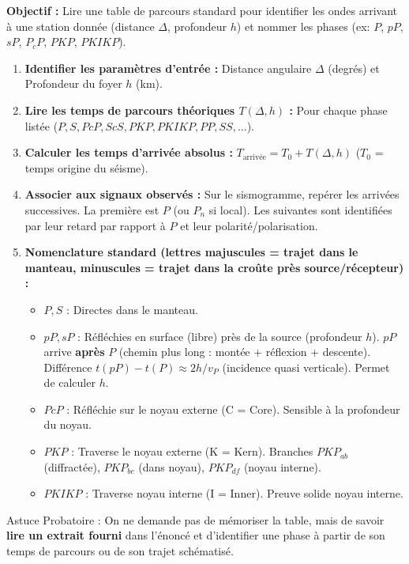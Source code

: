 \documentclass[11pt]{article}
\newcommand{\cle}[1]{{\popxbold\color{popdark}#1}}
\begin{document}
\begin{methode}
\textbf{Objectif :} Lire une table de parcours standard pour identifier les ondes arrivant à une station donnée (distance $\Delta$, profondeur $h$) et nommer les phases (ex: $P$, $pP$, $sP$, $P_cP$, $PKP$, $PKIKP$).
\begin{enumerate}
    \item \textbf{Identifier les paramètres d'entrée :} Distance angulaire $\Delta$ (degrés) et Profondeur du foyer $h$ (km).
    \item \textbf{Lire les temps de parcours théoriques $T(\Delta, h)$ :} Pour chaque phase listée ($P, S, PcP, ScS, PKP, PKIKP, PP, SS, \dots$).
    \item \textbf{Calculer les temps d'arrivée absolus :} $T_{\text{arrivée}} = T_0 + T(\Delta, h)$ ($T_0$ = temps origine du séisme).
    \item \textbf{Associer aux signaux observés :} Sur le sismogramme, repérer les arrivées successives. La première est $P$ (ou $P_n$ si local). Les suivantes sont identifiées par leur retard par rapport à $P$ et leur polarité/polarisation.
    \item \textbf{Nomenclature standard (lettres majuscules = trajet dans le manteau, minuscules = trajet dans la croûte près source/récepteur) :}
    \begin{itemize}
        \item $P, S$ : Directes dans le manteau.
        \item $pP, sP$ : Réfléchies en surface (libre) près de la source (profondeur $h$). $pP$ arrive \textbf{après} $P$ (chemin plus long : montée + réflexion + descente). Différence $t(pP)-t(P) \approx 2h/v_P$ (incidence quasi verticale). Permet de calculer $h$.
        \item $PcP$ : Réfléchie sur le noyau externe (C = Core). Sensible à la profondeur du noyau.
        \item $PKP$ : Traverse le noyau externe (K = Kern). Branches $PKP_{ab}$ (diffractée), $PKP_{bc}$ (dans noyau), $PKP_{df}$ (noyau interne).
        \item $PKIKP$ : Traverse noyau interne (I = Inner). Preuve solide noyau interne.
    \end{itemize}
\end{enumerate}
\cle{Astuce Probatoire :} On ne demande pas de mémoriser la table, mais de savoir \textbf{lire un extrait fourni} dans l'énoncé et d'identifier une phase à partir de son temps de parcours ou de son trajet schématisé.
\end{methode}
\end{document}

